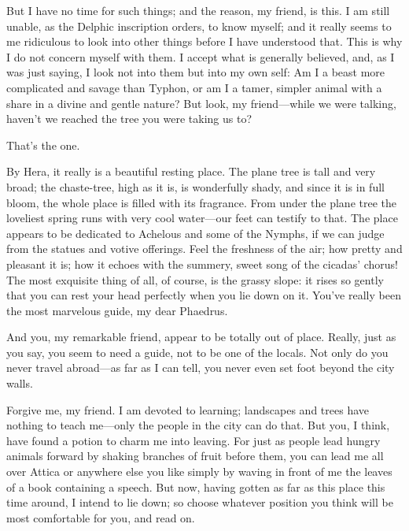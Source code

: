 But I have no time for such things; and the reason, my friend, is this.
I am still unable, as the Delphic inscription orders, to
know myself; and it really seems to me ridiculous to look into other
things before I have understood that. This is why I do not concern
myself with them. I accept what is generally believed, and, as I was
just saying, I look not into them but into my own self: Am I a beast
more complicated and savage than Typhon, or am I a tamer, simpler animal with a share in a 
divine and gentle nature? But look, my 
friend---while we were talking, haven't we reached the tree you were
taking us to?

\sayphaedrus That's the one.

\saysocrates By Hera, it really is a beautiful resting place. The plane
tree is tall and very broad; the chaste-tree, high as it is, is
wonderfully shady, and since it is in full bloom, the whole place is
filled with its fragrance. From under the plane tree the loveliest
spring runs with very cool water---our feet can testify to that. The
place appears to be dedicated to Achelous and some of the Nymphs, if we
can judge from the statues and votive 
offerings. Feel the
freshness of the air; how pretty and pleasant it is; how it echoes with
the summery, sweet song of the cicadas' chorus! The most exquisite thing
of all, of course, is the grassy slope: it rises so gently that you can
rest your head perfectly when you lie down on it. You've really been the
most marvelous guide, my dear Phaedrus.

\sayphaedrus And you, my remarkable friend, appear to be totally out of 
place. Really, just as you say, you seem to need a guide, not to
be one of the locals. Not only do you never travel abroad---as far as I
can tell, you never even set foot beyond the city walls.

\saysocrates Forgive me, my friend. I am devoted to learning; landscapes
and trees have nothing to teach me---only the people in the city can do
that. But you, I think, have found a potion to charm me into leaving.
For just as people lead hungry animals forward by shaking
branches of fruit before them, you can lead me all over Attica or
anywhere else you like simply by waving in front of me the leaves of a
book containing a speech. But now, having gotten as far as this place
this time around, I intend to lie down; so choose whatever position you
think will be most comfortable for you, and read on.


